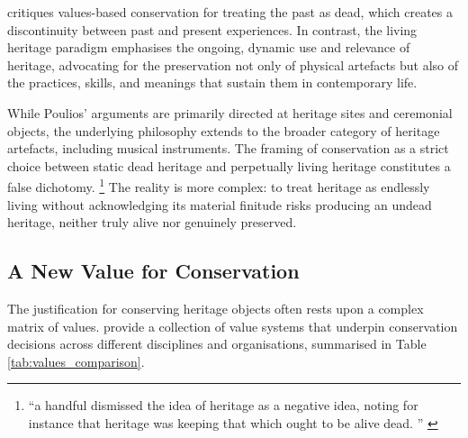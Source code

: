 \textcite{poulios_moving_2010} critiques values-based conservation for treating
the past as dead, which creates a discontinuity between past and present
experiences. In contrast, the living heritage paradigm emphasises the ongoing,
dynamic use and relevance of heritage, advocating for the preservation not only
of physical artefacts but also of the practices, skills, and meanings that
sustain them in contemporary life.

While Poulios’ arguments are primarily directed at heritage sites and ceremonial
objects, the underlying philosophy extends to the broader category of heritage
artefacts, including musical instruments. The framing of conservation as a
strict choice between static dead heritage and perpetually living heritage
constitutes a false dichotomy.%
\footnote{``a handful dismissed the idea of
heritage as a negative idea, noting for instance that heritage was keeping that
which ought to be alive dead. '' \cite{smith_uses_2006}}
The reality is more complex: to treat heritage as endlessly living without 
acknowledging its material finitude risks producing an undead heritage, neither 
truly alive nor genuinely preserved.


\subsection{A New Value for Conservation}

The justification for conserving heritage objects often rests upon a complex
matrix of values. \textcite{avrami_values_2000} provide a collection of value
systems that underpin conservation decisions across different disciplines and
organisations, summarised in Table \ref{tab:values_comparison}.

